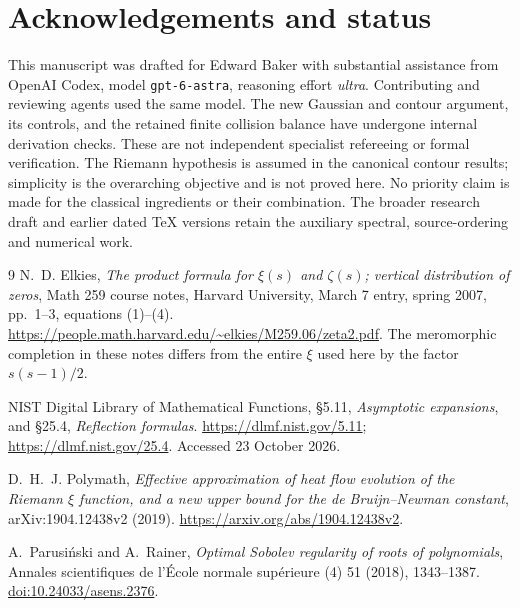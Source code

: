 \documentclass[11pt]{article}
\theoremstyle{remark}
\begin{document}
\section*{Acknowledgements and status}

This manuscript was drafted for Edward Baker with substantial assistance
from OpenAI Codex, model \texttt{gpt-6-astra}, reasoning effort
\emph{ultra}. Contributing and reviewing agents used the same model.
The new Gaussian and contour argument, its controls, and the retained
finite collision balance have undergone internal derivation checks.
These are not independent specialist refereeing or formal verification.
The Riemann hypothesis is assumed in the canonical contour results;
simplicity is the overarching objective and is not proved here.
No priority claim is made for the classical ingredients or their
combination. The broader research draft and earlier dated TeX versions
retain the auxiliary spectral, source-ordering and numerical work.

\begin{thebibliography}{9}
N.~D. Elkies,
\emph{The product formula for $\xi(s)$ and $\zeta(s)$; vertical
distribution of zeros}, Math 259 course notes, Harvard University,
March 7 entry, spring 2007, pp.~1--3, equations (1)--(4).
\url{https://people.math.harvard.edu/~elkies/M259.06/zeta2.pdf}.
The meromorphic completion in these notes differs from the entire
$\xi$ used here by the factor $s(s-1)/2$.

NIST Digital Library of Mathematical Functions,
\S5.11, \emph{Asymptotic expansions}, and
\S25.4, \emph{Reflection formulas}.
\url{https://dlmf.nist.gov/5.11};
\url{https://dlmf.nist.gov/25.4}. Accessed 23 October 2026.

D.~H.~J. Polymath,
\emph{Effective approximation of heat flow evolution of the Riemann
$\xi$ function, and a new upper bound for the de Bruijn--Newman constant},
arXiv:1904.12438v2 (2019).
\url{https://arxiv.org/abs/1904.12438v2}.

A.~Parusi\'nski and A.~Rainer,
\emph{Optimal Sobolev regularity of roots of polynomials},
Annales scientifiques de l'\'Ecole normale sup\'erieure (4) 51 (2018),
1343--1387.
\href{https://doi.org/10.24033/asens.2376}{doi:10.24033/asens.2376}.
\end{thebibliography}
\end{document}
